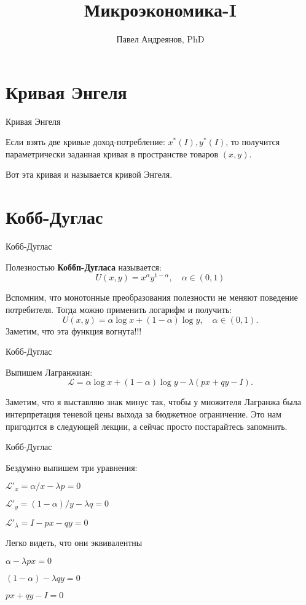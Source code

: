 \documentclass{beamer}
\title{
Микроэкономика-I
}
\author{
Павел Андреянов, PhD
}
\begin{document}
\maketitle

\section{Кривая Энгеля}

\begin{frame}{Кривая Энгеля}

Если взять две кривые доход-потребление: $x^{\ast}(I), y^{\ast}(I)$, то получится параметрически заданная кривая в пространстве товаров $(x,y)$. 

Вот эта кривая и называется кривой Энгеля.

\end{frame}

\section{Кобб-Дуглас}

\begin{frame}{Кобб-Дуглас}

\begin{definition}
Полезностью \textbf{Коббп-Дугласа} называется:
$$U(x, y) = x^{\alpha} y^{1-\alpha}, \quad \alpha \in (0,1)$$  
\end{definition}

Вспомним, что монотонные преобразования полезности не меняют поведение потребителя. Тогда можно применить логарифм и получить:
$$ U(x, y) = \alpha \log x + (1-\alpha) \log y, \quad \alpha \in (0,1).$$ 
Заметим, что эта функция вогнута!!! 
\end{frame}

\begin{frame}{Кобб-Дуглас}

Выпишем Лагранжиан:
$$ \mathcal{L} = \alpha \log x + (1-\alpha) \log y - \lambda (px + qy -I).$$ 

Заметим, что я выставляю знак минус так, чтобы у множителя Лагранжа была интерпретация теневой цены выхода за бюджетное ограничение. Это нам пригодится в следующей лекции, а сейчас просто постарайтесь запомнить.
\end{frame}

\begin{frame}{Кобб-Дуглас}

Бездумно выпишем три уравнения:

$\mathcal{L}'_x = \alpha/ x - \lambda p = 0$

$\mathcal{L}'_y = (1-\alpha)/y - \lambda q = 0$

$\mathcal{L}'_{\lambda} = I - p x - qy = 0$

Легко видеть, что они эквивалентны

$\alpha - \lambda p x= 0$

$(1-\alpha) - \lambda q y= 0$

$px + qy - I = 0$

\end{frame}
\end{document}
